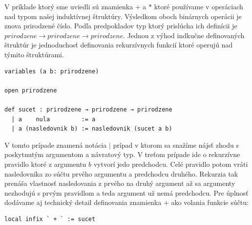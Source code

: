 \documentclass[a4paper,10pt,oneside]{report}%
\begin{document}
    V príklade ktorý sme uviedli sú znamienka $+$ a $*$ ktoré používame
v operáciach nad typom našej induktívnej štruktúry.
    Výsledkom oboch binárnych operácii je znova prirodzené číslo.
    Podľa predpokladov typ ktorý prislúcha ich definícii je
$prirodzene \to prirodzene \to prirodzene$.
    Jednou z výhod indkučne definovaných štruktúr je jednoduchosť definovania
rekurzívnych funkcií ktoré operujú nad týmito štruktúrami.
\begin{lstlisting}
variables (a b: prirodzene)

open prirodzene

def sucet : prirodzene → prirodzene → prirodzene
  | a    nula         := a
  | a (nasledovnik b) := nasledovnik (sucet a b)
\end{lstlisting}
    V tomto prípade znamená notácia $|$ prípad v ktorom sa snažíme nájsť zhodu
s poskytnutým argumentom a návratový typ.
    V treťom prípade ide o rekurzívne pravidlo ktoré z argumentu $b$ vytvorí jedo
predchodcu.
    Celé pravidlo potom vráti nasledovníka zo súčtu prvého argumentu a predchodcu
druhého.
    Rekurzia tak prenáša vlastnosť nasledovania z prvého na druhý argument až
sa argumenty nezhodujú s prvým pravidlom a teda argument už nemá predchodcu.
    Pre úplnosť dodávame aj technický detail definovania znamienka $+$ ako volania
funkcie súčtu:
\begin{lstlisting}
local infix ` + ` := sucet
\end{lstlisting}
\end{document}
